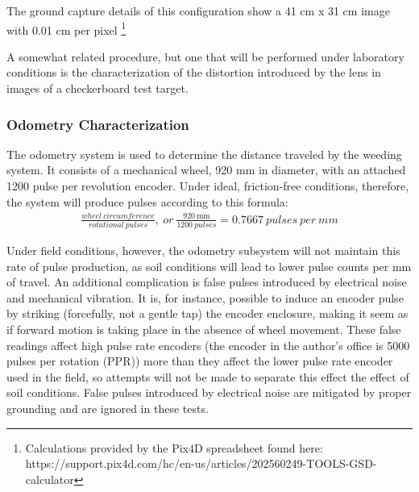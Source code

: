 \documentclass[12pt]{article}
\begin{document}
The ground capture details of this configuration show a 41 cm x 31 cm image with 0.01 cm per pixel \footnote{Calculations provided by the Pix4D spreadsheet found here: https://support.pix4d.com/hc/en-us/articles/202560249-TOOLS-GSD-calculator}

A somewhat related procedure, but one that will be performed under laboratory conditions is the characterization of the distortion introduced by the lens in images of a checkerboard test target. 
\subsubsection{Odometry Characterization}
The odometry system is used to determine the distance traveled by the weeding system. It consists of a mechanical wheel, 920 mm in diameter, with an attached 1200 pulse per revolution encoder. Under ideal, friction-free conditions, therefore, the system will produce pulses according to this formula:
\begin{align}
\frac {wheel\ circumference}  {rotational\ pulses},\  or\  \frac {\SI{920}{\milli\meter}} {1200\ pulses} = 0.7667\ pulses\ per\ mm
\end{align}

Under field conditions, however, the odometry subsystem will not maintain this rate of pulse production, as soil conditions will lead to lower pulse counts per mm of travel. An additional complication is false pulses introduced by electrical noise and mechanical vibration.  It is, for instance, possible to induce an encoder pulse by striking (forcefully, not a gentle tap) the encoder enclosure, making it seem as if forward motion is taking place in the absence of wheel movement. These false readings affect high pulse rate encoders (the encoder in the author's office is 5000 pulses per rotation (PPR)) more than they affect the lower pulse rate encoder used in the field, so attempts will not be made to separate this effect the effect of soil conditions. False pulses introduced by electrical noise are mitigated by proper grounding and are ignored in these tests.
\end{document}
